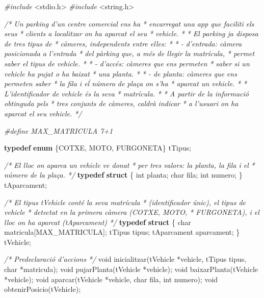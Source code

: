 \documentclass[]{book}
\newenvironment{Shaded}{\begin{snugshade}}{\end{snugshade}}
\newcommand{\KeywordTok}[1]{\textcolor[rgb]{0.13,0.29,0.53}{\textbf{#1}}}
\newcommand{\DataTypeTok}[1]{\textcolor[rgb]{0.13,0.29,0.53}{#1}}
\newcommand{\ImportTok}[1]{#1}
\newcommand{\CommentTok}[1]{\textcolor[rgb]{0.56,0.35,0.01}{\textit{#1}}}
\newcommand{\PreprocessorTok}[1]{\textcolor[rgb]{0.56,0.35,0.01}{\textit{#1}}}
\newcommand{\NormalTok}[1]{#1}
\begin{document}
\begin{Shaded}
\begin{Highlighting}[]
\PreprocessorTok{#include }\ImportTok{<stdio.h>}
\PreprocessorTok{#include }\ImportTok{<string.h>}

\CommentTok{/* Un parking d'un centre comercial ens ha }
\CommentTok{ * encarregat una app que faciliti els seus}
\CommentTok{ * clients a localitzar on ha aparcat el seu}
\CommentTok{ * vehicle.}
\CommentTok{ * }
\CommentTok{ * El parking ja disposa de tres tipus de }
\CommentTok{ * càmeres, independents entre elles:}
\CommentTok{ * }
\CommentTok{ * - d'entrada: càmera posicionada a l'entrada}
\CommentTok{ *   del pàrking que, a més de llegir la matrícula,}
\CommentTok{ *   permet saber el tipus de vehicle.}
\CommentTok{ * }
\CommentTok{ * - d'accés: càmeres que ens permeten}
\CommentTok{ *   saber si un vehicle ha pujat o ha baixat}
\CommentTok{ *   una planta.}
\CommentTok{ * }
\CommentTok{ * - de planta: càmeres que ens permeten saber}
\CommentTok{ *   la fila i eĺ número de plaça on s'ha }
\CommentTok{ *   aparcat un vehicle.}
\CommentTok{ * }
\CommentTok{ * L'identificador de vehicle és la seva }
\CommentTok{ * matrícula.}
\CommentTok{ * }
\CommentTok{ * A partir de la informació obtinguda pels}
\CommentTok{ * tres conjunts de càmeres, caldrà indicar}
\CommentTok{ * a l'usuari on ha aparcat el seu vehicle.}
\CommentTok{ */}

\PreprocessorTok{#define MAX_MATRICULA 7+1}

\KeywordTok{typedef} \KeywordTok{enum}\NormalTok{ \{COTXE, MOTO, FURGONETA\} tTipus;}

\CommentTok{/* El lloc on aparca un vehicle ve donat}
\CommentTok{ * per tres valors: la planta, la fila i el }
\CommentTok{ * número de la plaça.}
\CommentTok{ */}
\KeywordTok{typedef} \KeywordTok{struct}\NormalTok{ \{}
    \DataTypeTok{int}\NormalTok{ planta;}
    \DataTypeTok{char}\NormalTok{ fila;}
    \DataTypeTok{int}\NormalTok{ numero;}
\NormalTok{\} tAparcament;}

\CommentTok{/* El tipus tVehicle conté la seva matrícula}
\CommentTok{ * (identificador únic), el tipus de vehicle}
\CommentTok{ * detectat en la primera càmera (COTXE, MOTO,}
\CommentTok{ * FURGONETA), i el lloc on ha aparcat (tAparcament)}
\CommentTok{ */}
\KeywordTok{typedef} \KeywordTok{struct}\NormalTok{ \{}
    \DataTypeTok{char}\NormalTok{ matricula[MAX_MATRICULA];}
\NormalTok{    tTipus tipus;}
\NormalTok{    tAparcament aparcament;}
\NormalTok{\} tVehicle;}

\CommentTok{/* Predeclaració d'accions */}
\DataTypeTok{void}\NormalTok{ inicialitzar(tVehicle *vehicle, tTipus tipus, }\DataTypeTok{char}\NormalTok{ *matricula);}
\DataTypeTok{void}\NormalTok{ pujarPlanta(tVehicle *vehicle);}
\DataTypeTok{void}\NormalTok{ baixarPlanta(tVehicle *vehicle);}
\DataTypeTok{void}\NormalTok{ aparcar(tVehicle *vehicle, }\DataTypeTok{char}\NormalTok{ fila, }\DataTypeTok{int}\NormalTok{ numero);}
\DataTypeTok{void}\NormalTok{ obtenirPosicio(tVehicle);}


\end{Highlighting}
\end{Shaded}
\end{document}
